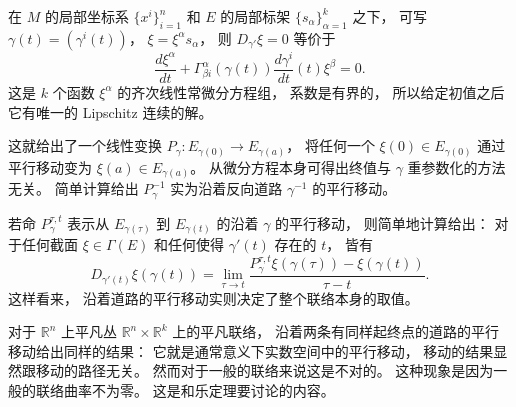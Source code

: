 在 $M$ 的局部坐标系 $\{x^i\}_{i=1}^n$ 和 $E$ 的局部标架 $\{s_{\alpha}\}_{\alpha=1}^k$ 之下， 可写 $\gamma(t)=(\gamma^i(t))$， $\xi=\xi^\alpha s_\alpha$， 则 $D_{\gamma'}\xi=0$ 等价于
$$
\frac{d\xi^\alpha}{dt}+\Gamma_{\beta i}^\alpha(\gamma(t))\frac{d\gamma^i}{dt}(t)\xi^\beta=0.
$$
这是 $k$ 个函数 $\xi^\alpha$ 的齐次线性常微分方程组， 系数是有界的， 所以给定初值之后它有唯一的 Lipschitz 连续的解。 

这就给出了一个线性变换 $P_{\gamma}:E_{\gamma(0)}\to E_{\gamma(a)}$， 将任何一个 $\xi(0)\in E_{\gamma(0)}$ 通过平行移动变为 $\xi(a)\in E_{\gamma(a)}$。 从微分方程本身可得出终值与 $\gamma$ 重参数化的方法无关。 简单计算给出 $P_\gamma^{-1}$ 实为沿着反向道路 $\gamma^{-1}$ 的平行移动。 

若命 $P_\gamma^{\tau,t}$ 表示从 $E_{\gamma(\tau)}$ 到 $E_{\gamma(t)}$ 的沿着 $\gamma$ 的平行移动， 则简单地计算给出： 对于任何截面 $\xi\in\Gamma(E)$ 和任何使得 $\gamma'(t)$ 存在的 $t$， 皆有
$$
D_{\gamma'(t)}\xi(\gamma(t))=\lim_{\tau\to t}\frac{P_\gamma^{\tau,t}\xi(\gamma(\tau))-\xi(\gamma(t))}{\tau-t}.
$$
这样看来， 沿着道路的平行移动实则决定了整个联络本身的取值。

对于 $\mathbb{R}^n$ 上平凡丛 $\mathbb{R}^n\times\mathbb{R}^k$ 上的平凡联络， 沿着两条有同样起终点的道路的平行移动给出同样的结果： 它就是通常意义下实数空间中的平行移动， 移动的结果显然跟移动的路径无关。 然而对于一般的联络来说这是不对的。 这种现象是因为一般的联络曲率不为零。 这是和乐定理要讨论的内容。
